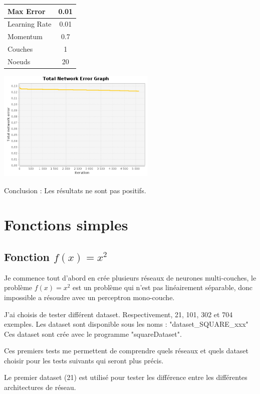 \documentclass[10pt]{report}
\begin{document}
\begin{tabular}{|l|c|}
	\hline
	Max Error & 0.01 \\
	\hline
	Learning Rate & 0.01 \\
	\hline
	Momentum & 0.7 \\
	\hline
	Couches & 1 \\
	\hline
	Noeuds & 20 \\
	\hline
\end{tabular}

\begin{center}
\includegraphics[height=200px]{img/EQ_EG_12.png}\\
\end{center}

Conclusion : Les résultats ne sont pas positifs.

\section{Fonctions simples}
\subsection{Fonction $f(x)=x^2$}

Je commence tout d'abord en crée plusieurs réseaux de neurones multi-couches, le problème $f(x)=x^2$ est un problème qui n'est pas linéairement séparable, donc impossible a résoudre avec un perceptron mono-couche.

J'ai choisis de tester différent dataset. Respectivement, 21, 101, 302 et 704 exemples. Les dataset sont disponible sous les noms : "dataset\_SQUARE\_xxx"
Ces dataset sont crée avec le programme "squareDataset".

Ces premiers tests me permettent de comprendre quels réseaux et quels dataset choisir pour les tests suivants qui seront plus précis.

Le premier dataset (21) est utilisé pour tester les différence entre les différentes architectures de réseau.
\end{document}
